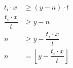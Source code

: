 \begin{align*}
           t_i \cdot x & \geq (y - n) \cdot t\\
\dfrac{t_i \cdot x}{t} & \geq y - n\\
                     n & \geq y - \dfrac{t_i \cdot x}{t}\\
                     n & = \left\lfloor y - \dfrac{t_i \cdot x}{t} \right\rfloor\\
\end{align*}
